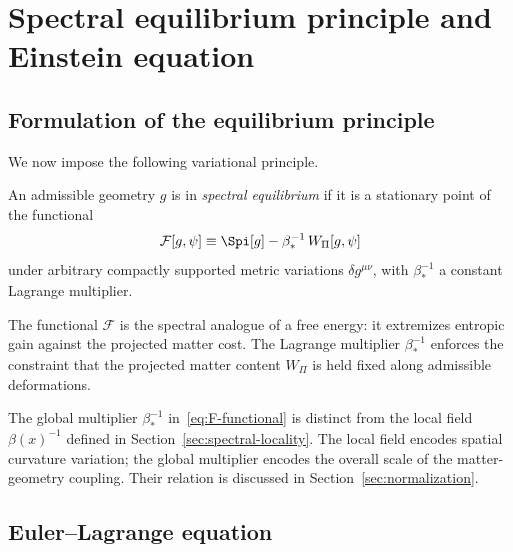 \section{Spectral equilibrium principle and Einstein equation}
  \label{sec:equilibrium}

  \subsection{Formulation of the equilibrium principle}
    \label{subsec:equilibrium-formulation}

    We now impose the following variational principle.

    \begin{definition}
      \label{def:equilibrium}
      An admissible geometry $g$ is in \emph{spectral equilibrium} if it is a
      stationary point of the functional
      \begin{equation}
        \mathcal{F}[g,\psi]
        \equiv
        \Spi[g] - \beta_*^{-1}\,W_\Pi[g,\psi]
        \label{eq:F-functional}
      \end{equation}
      under arbitrary compactly supported metric variations $\delta g^{\mu\nu}$,
      with $\beta_*^{-1}$ a constant Lagrange multiplier.
    \end{definition}

    The functional $\mathcal{F}$ is the spectral analogue of a free energy: it extremizes
    entropic gain against the projected matter cost.
    The Lagrange multiplier $\beta_*^{-1}$ enforces the constraint that the projected
    matter content $W_\Pi$ is held fixed along admissible deformations.

    \begin{remark}
      \label{rem:beta-star}
      The global multiplier $\beta_*^{-1}$ in~\eqref{eq:F-functional} is distinct from
      the local field $\beta(x)^{-1}$ defined in Section~\ref{sec:spectral-locality}.
      The local field encodes spatial curvature variation; the global multiplier encodes
      the overall scale of the matter-geometry coupling.
      Their relation is discussed in Section~\ref{sec:normalization}.
    \end{remark}

  \subsection{Euler--Lagrange equation}
    \label{subsec:euler-lagrange}

